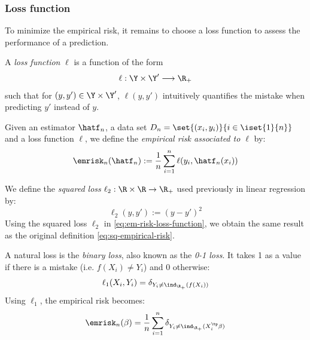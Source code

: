 \documentclass[toc, titlepaged]{../cs-classes/cs-classes}
\begin{document}
\subsubsection{Loss function}
To minimize the empirical risk, it remains to choose a loss function to assess the performance of a prediction. 

\begin{definition}
    A \emph{loss function} $\ell$ is a function of the form
    \begin{equation*}
        \ell : \Y\times\Y' \longrightarrow \R_+
    \end{equation*}
    such that for $(y, y')\in\Y\times\Y'$, $\ell(y, y')$ intuitively quantifies the mistake when predicting $y'$ instead of $y$. 
\end{definition}

\begin{definition}
    Given an estimator $\hatf_n$, a data set $D_n=\set{(x_i, y_i)}{i\in\iset{1}{n}}$ and a loss function $\ell$, we define the \emph{empirical risk associated to $\ell$} by:
    \begin{equation}
        \label{eq:em-risk-loss-function}
        \emrisk_n(\hatf_n) := \frac{1}{n}\sum_{i=1}^n \ell(y_i, \hatf_n(x_i))
    \end{equation}
\end{definition}

\begin{definition}
    We define the \emph{squared loss} $\ell_2:\R\times\R\to\R_+$ used previously in linear regression by:
    \begin{equation}
        \ell_2(y, y') := (y-y')^2
    \end{equation}
    Using the squared loss $\ell_2$ in \eqref{eq:em-risk-loss-function}, we obtain the same result as the original definition \eqref{eq:sq-empirical-risk}. 
\end{definition}

\begin{definition}
    A natural loss is the \emph{binary loss}, also known as the \emph{0-1 loss}. It takes 1 as a value if there is a mistake (i.e. $f(X_i)\neq Y_i$) and 0 otherwise:
    \begin{equation}
        \ell_{1}(X_i, Y_i) = \delta_{Y_i\neq\ind_{\R_+}(f(X_i))}
    \end{equation}
    Using $\ell_1$, the empirical risk becomes:
    \begin{equation*}
        \emrisk_n(\beta) = \frac{1}{n}\sum_{i=1}^n \delta_{Y_i\neq\ind_{\R_+}(X_i^\tp\beta)}
    \end{equation*}
\end{definition}
\end{document}
